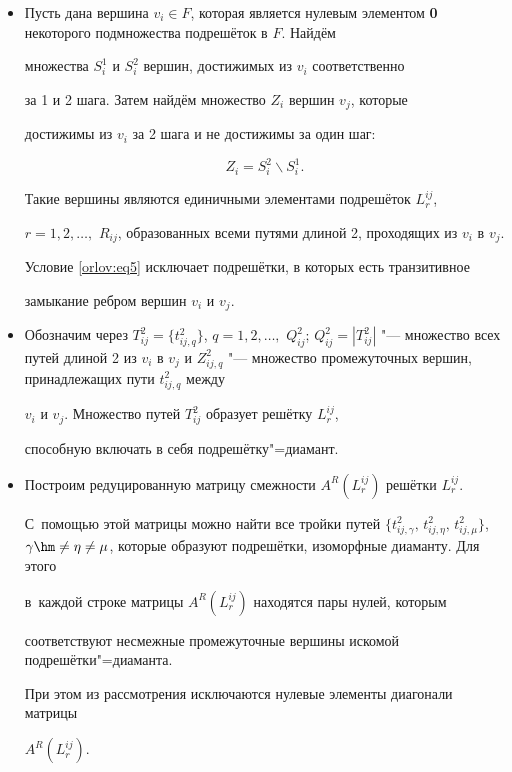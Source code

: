 \begin{itemize}



\item[1.] Пусть дана вершина $v_i \in  F$, которая является нулевым элементом \textbf{0} некоторого подмножества подрешёток в $F$. Найдём

множества $S_i^1$ и $S_i^2$ вершин, достижимых из $v_{i}$ соответственно

за 1 и 2 шага. Затем найдём множество $Z_i$ вершин $v_j$, которые

достижимы из $v_i$ за 2 шага и не достижимы за один шаг:

\begin{equation}

\label{orlov:eq5}

Z_i =S_i^2 \backslash S_i^1.

\end{equation}



Такие вершины являются единичными элементами подрешёток $L_r^{ij}$,

$r=1, 2, \ldots,$ $ R_{ij}$, образованных всеми путями длиной 2, проходящих из $v_i$ в $v_j$. 

Условие \eqref{orlov:eq5} исключает подрешётки, в которых есть транзитивное

замыкание ребром вершин $v_i$ и $v_j$.



\item[2.] Обозначим через $T_{ij}^2 =\{ t_{ij,q}^2 \}$, $q=1, 2, \ldots,$ $ Q_{ij}^2$; $Q_{ij}^2 =|T_{ij}^2|$ "--- множество всех путей длиной 2 из $v_i$ в $v_j$ и $Z_{ij,q}^2$ "--- множество промежуточных вершин, принадлежащих пути $t_{ij,q}^2 $ между

$v_i$ и $v_j$. Множество путей $T_{ij}^2 $ образует решётку $L_r^{ij}$,

способную включать в себя подрешётку"=диамант.



\item[3.] Построим редуцированную матрицу смежности $A^R(L_r^{ij})$ решётки $L_r^{ij}$. 

С~помощью этой матрицы можно найти все тройки путей $\bigl\{ t_{ij,\gamma }^2,\,t_{ij,\eta }^2 ,\,t_{ij,\mu }^2 \bigr\}$, $\gamma \hm \ne

\eta \ne \mu $, которые образуют подрешётки, изоморфные диаманту. Для этого

в~каждой строке матрицы $A^R(L_r^{ij}) $ находятся пары нулей, которым

соответствуют несмежные промежуточные вершины искомой подрешётки"=диаманта.

При этом из рассмотрения исключаются нулевые элементы диагонали матрицы

$A^R\left(L_r^{ij} \right)$.



\end{itemize}




